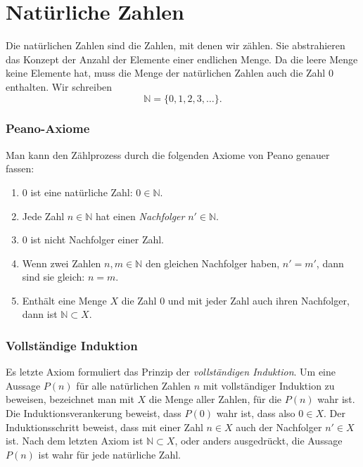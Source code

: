 %
%
%
\section{Natürliche Zahlen
\label{buch:section:natuerliche-zahlen}}
Die natürlichen Zahlen sind die Zahlen, mit denen wir zählen.
%
%
Sie abstrahieren das Konzept der Anzahl der Elemente einer endlichen
Menge.
Da die leere Menge keine Elemente hat, muss die Menge der natürlichen
Zahlen auch die Zahl $0$ enthalten.
Wir schreiben
\[
\mathbb{N}
=
\{
0,1,2,3,\dots
\}.
\]

\subsubsection{Peano-Axiome}
%
Man kann den Zählprozess durch die folgenden Axiome von Peano genauer fassen:
%
\begin{enumerate}
\item $0$ ist eine natürliche Zahl: $0\in\mathbb N$.
\item Jede Zahl $n\in \mathbb{N}$ hat einen {\em Nachfolger}
$n'\in \mathbb{N}$.
%
\item $0$ ist nicht Nachfolger einer Zahl.
\item Wenn zwei Zahlen $n,m\in\mathbb{N}$ den gleichen Nachfolger haben,
$n'=m'$, dann sind sie gleich: $n=m$.
\item Enthält eine Menge $X$ die Zahl $0$ und mit jeder Zahl auch ihren
Nachfolger, dann ist $\mathbb{N}\subset X$.
\end{enumerate}

\subsubsection{Vollständige Induktion}
Es letzte Axiom formuliert das Prinzip der {\em vollständigen Induktion}.
%
%
Um eine Aussage $P(n)$ für alle natürlichen Zahlen $n$
mit vollständiger Induktion zu beweisen, bezeichnet man mit
$X$ die Menge aller Zahlen, für die $P(n)$ wahr ist.
Die Induktionsverankerung beweist, dass $P(0)$ wahr ist, dass also $0\in X$.
Der Induktionsschritt beweist, dass mit einer Zahl $n\in X$ auch der
Nachfolger $n'\in X$ ist.
Nach dem letzten Axiom ist $\mathbb{N}\subset X$, oder anders ausgedrückt,
die Aussage $P(n)$ ist wahr für jede natürliche Zahl.

